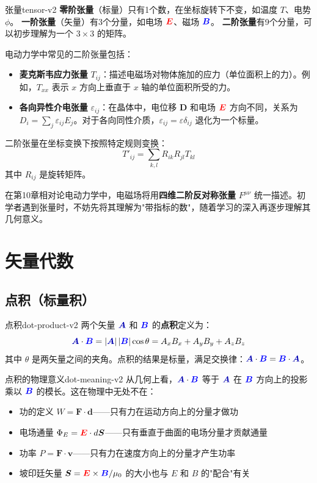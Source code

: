 \documentclass[11pt,a4paper,openany,oneside]{book}
\newcommand{\vecE}{\textcolor{red}{\vect{E}}}
\newcommand{\vecB}{\textcolor{blue}{\vect{B}}}
\newcommand{\vecA}{\textcolor{blue!70!black}{\vect{A}}}
\newcommand{\vect}[1]{\bm{#1}}
\begin{document}
\begin{definition}{张量}{tensor-v2}
\textbf{零阶张量}（标量）只有1个数，在坐标旋转下不变，如温度 $T$、电势 $\phi$。
\textbf{一阶张量}（矢量）有3个分量，如电场 $\vecE$、磁场 $\vecB$。
\textbf{二阶张量}有9个分量，可以初步理解为一个 $3\times 3$ 的矩阵。

电动力学中常见的二阶张量包括：
\begin{itemize}
\item \textbf{麦克斯韦应力张量} $T_{ij}$：描述电磁场对物体施加的应力（单位面积上的力）。例如，$T_{xx}$ 表示 $x$ 方向上垂直于 $x$ 轴的单位面积所受的力。
\item \textbf{各向异性介电张量} $\varepsilon_{ij}$：在晶体中，电位移 $\vect{D}$ 和电场 $\vecE$ 方向不同，关系为 $D_i = \sum_j \varepsilon_{ij} E_j$。对于各向同性介质，$\varepsilon_{ij} = \varepsilon \delta_{ij}$ 退化为一个标量。
\end{itemize}

二阶张量在坐标变换下按照特定规则变换：
\[
T'_{ij} = \sum_{k,l} R_{ik} R_{jl} T_{kl}
\]
其中 $R_{ij}$ 是旋转矩阵。

在第10章相对论电动力学中，电磁场将用\textbf{四维二阶反对称张量} $F^{\mu\nu}$ 统一描述。初学者遇到张量时，不妨先将其理解为"带指标的数"，随着学习的深入再逐步理解其几何意义。
\end{definition}

\section{矢量代数}

\subsection{点积（标量积）}

\begin{definition}{点积}{dot-product-v2}
两个矢量 $\vecA$ 和 $\vecB$ 的\textbf{点积}定义为：
\[
\vecA \cdot \vecB = |\vecA| \, |\vecB| \cos\theta = A_x B_x + A_y B_y + A_z B_z
\]
其中 $\theta$ 是两矢量之间的夹角。点积的结果是标量，满足交换律：$\vecA \cdot \vecB = \vecB \cdot \vecA$。
\end{definition}

\begin{insight}{点积的物理意义}{dot-meaning-v2}
从几何上看，$\vecA \cdot \vecB$ 等于 $\vecA$ 在 $\vecB$ 方向上的投影乘以 $\vecB$ 的模长。这在物理中无处不在：
\begin{itemize}
\item 功的定义 $W = \vect{F} \cdot \vect{d}$——只有力在运动方向上的分量才做功
\item 电场通量 $\Phi_E = \vecE \cdot d\vect{S}$——只有垂直于曲面的电场分量才贡献通量
\item 功率 $P = \vect{F} \cdot \vect{v}$——只有力在速度方向上的分量才产生功率
\item 坡印廷矢量 $\vect{S} = \vecE \times \vecB/\mu_0$ 的大小也与 $E$ 和 $B$ 的"配合"有关
\end{itemize}
\end{insight}
\end{document}
